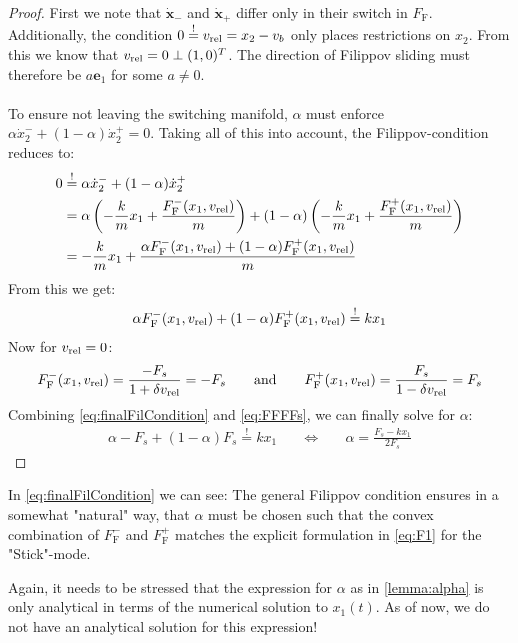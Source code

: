 \begin{proof}
	First we note that $\dot{\mathbf{x}}_-$ and $\dot{\mathbf{x}}_+$ differ only in their switch in $F_{\text{F}}$. Additionally, the condition $0\overset{!}{=}v_{\text{rel}}=x_2 - v_b$ only places restrictions on $ x_2 $. From this we know that $v_{\text{rel}}=0 \perp (1, 0)^T$. The direction of Filippov sliding must therefore be $a\mathbf{e}_1$ for some $a\neq0$.\\ \\
	To ensure not leaving the switching manifold, $\alpha$ must enforce $ \alpha \dot{x}_2^- + (1-\alpha) \dot{x}_2^+ =0 $. Taking all of this into account, the Filippov-condition reduces to:
	\begin{align*}
		0 &\overset{!}{=} \alpha \dot{x}_2^- + (1-\alpha) \dot{x}_2^+ \\
		&= \alpha \left(-\frac{k}{m}x_1 + \frac{F_{\text{F}}^-(x_1, v_{\text{rel}})}{m}\right) + (1-\alpha)\left( -\frac{k}{m}x_1 + \frac{F_{\text{F}}^+(x_1, v_{\text{rel}})}{m} \right) \\
		&= -\frac{k}{m}x_1 + \frac{\alpha F_{\text{F}}^-(x_1, v_{\text{rel}}) + (1-\alpha)F_{\text{F}}^+(x_1, v_{\text{rel}})}{m}
	\end{align*}
	From this we get:
	\begin{align}
		\alpha F_{\text{F}}^-(x_1, v_{\text{rel}}) + (1-\alpha)F_{\text{F}}^+(x_1, v_{\text{rel}}) \overset{!}{=} kx_1 \label{eq:finalFilCondition}
	\end{align}
	Now for $v_{\text{rel}}=0$:
	\begin{align}
		F_{\text{F}}^-(x_1, v_{\text{rel}}) = \frac{-F_s}{1+\delta v_{\text{rel}}} = -F_s \hspace{20pt} \text{and} \hspace{20pt} F_{\text{F}}^+(x_1, v_{\text{rel}}) = \frac{F_s}{1-\delta v_{\text{rel}}} = F_s \label{eq:FFFFs}
	\end{align}
	Combining \autoref{eq:finalFilCondition} and \autoref{eq:FFFFs}, we can finally solve for $\alpha$:
	\begin{align*}
		\alpha -F_s + (1-\alpha)F_s \overset{!}{=} kx_1 \hspace{20pt} \Leftrightarrow \hspace{20pt} \alpha = \frac{F_s - kx_1}{2F_s}
	\end{align*}
\end{proof}
\begin{remark}
	In \autoref{eq:finalFilCondition} we can see: The general Filippov condition ensures in a somewhat "natural" way, that $\alpha$ must be chosen such that the convex combination of $ F_{\text{F}}^- $ and $F_{\text{F}}^+$ matches the explicit formulation in \autoref{eq:F1} for the "Stick"-mode.
\end{remark}
\begin{remark}
	Again, it needs to be stressed that the expression for $\alpha$ as in \autoref{lemma:alpha} is only analytical in terms of the numerical solution to $x_1(t)$. As of now, we do not have an analytical solution for this expression!
\end{remark}